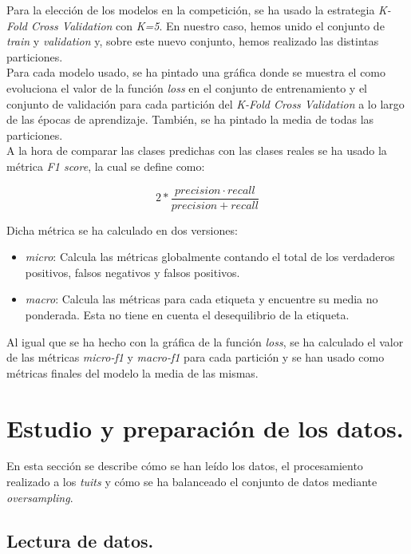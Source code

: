\documentclass[11pt]{article}
\begin{document}
Para la elección de los modelos en la competición, se ha usado la estrategia \textit{K-Fold Cross Validation} con \textit{K=5}. En nuestro caso, hemos unido el conjunto de \textit{train} y \textit{validation} y, sobre este nuevo conjunto, hemos realizado las distintas particiones. \\

Para cada modelo usado, se ha pintado una gráfica donde se muestra el como evoluciona el valor de la función \textit{loss} en el conjunto de entrenamiento y el conjunto de validación para cada partición del \textit{K-Fold Cross Validation} a lo largo de las épocas de aprendizaje. También, se ha pintado la media de todas las particiones. \\

A la hora de comparar las clases predichas con las clases reales se ha usado la métrica \textit{F1 score}, la cual se define como:

\begin{equation}
    2 * \frac{precision \cdot recall}{precision + recall}
\end{equation}

Dicha métrica se ha calculado en dos versiones:

\begin{itemize}
    \item \textit{micro}: Calcula las métricas globalmente contando el total de los verdaderos positivos, falsos negativos y falsos positivos.
    \item \textit{macro}: Calcula las métricas para cada etiqueta y encuentre su media no ponderada. Esta no tiene en cuenta el desequilibrio de la etiqueta.
\end{itemize}

Al igual que se ha hecho con la gráfica de la función \textit{loss}, se ha calculado el valor de las métricas \textit{micro-f1} y \textit{macro-f1} para cada partición y se han usado como métricas finales del modelo la media de las mismas.

\section{Estudio y preparación de los datos.}

En esta sección se describe cómo se han leído los datos, el procesamiento realizado a los \textit{tuits} y cómo se ha balanceado el conjunto de datos mediante \textit{oversampling}.

\subsection{Lectura de datos.}
\end{document}
